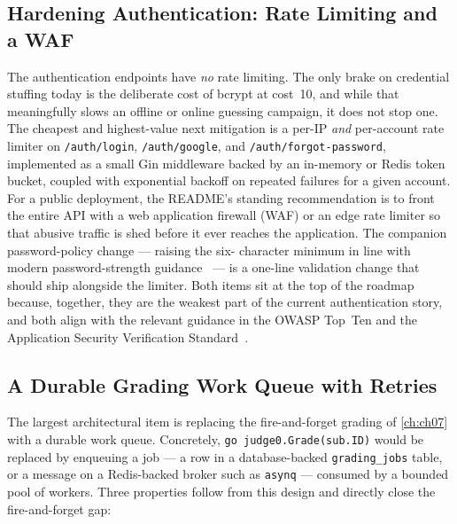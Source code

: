 \subsection{Hardening Authentication: Rate Limiting and a WAF}

The authentication endpoints have \emph{no} rate limiting. The only brake on
credential stuffing today is the deliberate cost of bcrypt at cost~10, and while
that meaningfully slows an offline or online guessing campaign, it does not stop
one. The cheapest and highest-value next mitigation is a per-IP \emph{and}
per-account rate limiter on \texttt{/auth/login}, \texttt{/auth/google}, and
\texttt{/auth/forgot-password}, implemented as a small Gin middleware backed by
an in-memory or Redis token bucket, coupled with exponential backoff on repeated
failures for a given account. For a public deployment, the README's standing
recommendation is to front the entire API with a web application firewall (WAF)
or an edge rate limiter so that abusive traffic is shed before it ever reaches
the application. The companion password-policy change --- raising the six-
character minimum in line with modern password-strength
guidance~\cite{nist80063b} --- is a one-line validation change that should ship
alongside the limiter. Both items sit at the top of the roadmap because,
together, they are the weakest part of the current authentication story, and
both align with the relevant guidance in the OWASP Top~Ten and the Application
Security Verification Standard~\cite{owasp-top10,owasp-asvs}.

\subsection{A Durable Grading Work Queue with Retries}

The largest architectural item is replacing the fire-and-forget grading of
\cref{ch:ch07} with a durable work queue. Concretely,
\texttt{go judge0.Grade(sub.ID)} would be replaced by enqueuing a job --- a row in a database-backed \texttt{grading\_jobs}
table, or a message on a Redis-backed broker such as \texttt{asynq} --- consumed
by a bounded pool of workers. Three properties follow from this design and
directly close the fire-and-forget gap:

